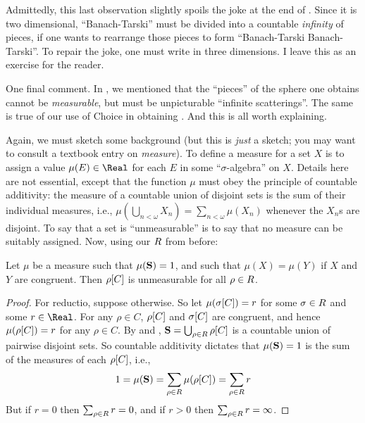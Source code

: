 \documentclass[../../../include/open-logic-section]{subfiles}
\begin{document}
Admittedly, this last observation slightly spoils the joke at the end
of . Since it is  two dimensional,
``Banach-Tarski'' must be divided into a countable \emph{infinity} of
pieces, if one wants to rearrange those pieces to form ``Banach-Tarski
Banach-Tarski''. To repair the joke, one must write in three
dimensions. I leave this as an exercise for the reader.

One final comment. In , we mentioned that the
``pieces'' of the sphere one obtains cannot be \emph{measurable}, but
must be unpicturable ``infinite scatterings''. The same is true of our
use of Choice in obtaining . And this is all
worth explaining.

Again, we must sketch some background (but this is \emph{just} a
sketch; you may want to consult a textbook entry on \emph{measure}).
To define a measure for a set $X$ is to assign a value $\mu(E) \in
\Real$ for each $E$ in some ``$\sigma$-algebra'' on $X$. Details here
are not essential, except that the function $\mu$ must obey the
principle of countable additivity: the measure of a countable union of
disjoint sets is the sum of their individual measures, i.e.,
$\mu(\bigcup_{n < \omega} X_n) = \sum_{n < \omega}\mu(X_n)$ whenever
the $X_n$s are disjoint. To say that a set is ``unmeasurable'' is to
say that no measure can be suitably assigned. Now, using our
$R$ from before:

\begin{cor}[Vitali]
Let $\mu$ be a measure such that $\mu(\mathbf{S}) = 1$, and such that
$\mu(X) = \mu(Y)$ if $X$ and $Y$ are congruent. Then
$\rho[C]$ is unmeasurable for all $\rho \in
R$. 
\end{cor}

\begin{proof}
For reductio, suppose otherwise. So let $\mu(\sigma[C]) =
r$ for some $\sigma \in R$ and some $r \in \Real$. For
any $\rho \in C$, $\rho[C]$ and $\sigma[C]$ are
congruent, and hence  $\mu(\rho[C]) = r$ for any $\rho \in
C$. By  and , $\mathbf{S} =
\bigcup_{\rho \in R}\rho[C]$ is a countable
union of pairwise disjoint sets. So countable additivity dictates that
$\mu(\mathbf{S}) = 1$ is the sum of the measures of each
$\rho[C]$, i.e.,
\[
	1 = \mu(\mathbf{S}) = \sum_{\rho \in R}\mu(\rho[C]) = \sum_{\rho \in R}r
\]
But if $r = 0$ then $\sum_{\rho \in R}r = 0$, and if $r
> 0$ then $\sum_{\rho \in R}r = \infty$. 
\end{proof}
\end{document}
